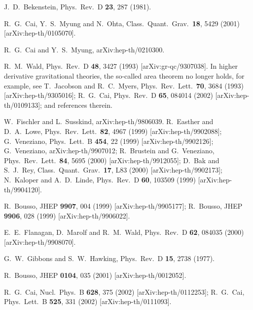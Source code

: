 \documentclass[a4paper,12pt]{article}
\begin{document}
\begin{thebibliography}{99}
J.~D.~Bekenstein,
Phys.\ Rev.\ D {\bf 23}, 287 (1981).

R.~G.~Cai, Y.~S.~Myung and N.~Ohta,
Class.\ Quant.\ Grav.\  {\bf 18}, 5429 (2001)
[arXiv:hep-th/0105070].

 R.~G.~Cai and Y.~S.~Myung,
arXiv:hep-th/0210300.

R.~M.~Wald,
Phys.\ Rev.\ D {\bf 48}, 3427 (1993)
[arXiv:gr-qc/9307038].
In higher derivative gravitational theories, the so-called area theorem 
no longer holds, for example, see
T.~Jacobson and R.~C.~Myers,
Phys.\ Rev.\ Lett.\  {\bf 70}, 3684 (1993) [arXiv:hep-th/9305016];
R.~G.~Cai,
Phys.\ Rev.\ D {\bf 65}, 084014 (2002)
[arXiv:hep-th/0109133];
and references therein. 

W.~Fischler and L.~Susskind,
arXiv:hep-th/9806039.
R.~Easther and D.~A.~Lowe,
Phys.\ Rev.\ Lett.\  {\bf 82}, 4967 (1999) [arXiv:hep-th/9902088];
G.~Veneziano,
Phys.\ Lett.\ B {\bf 454}, 22 (1999) [arXiv:hep-th/9902126];
G.~Veneziano,
arXiv:hep-th/9907012;
R.~Brustein and G.~Veneziano,
Phys.\ Rev.\ Lett.\  {\bf 84}, 5695 (2000) [arXiv:hep-th/9912055];
D.~Bak and S.~J.~Rey,
Class.\ Quant.\ Grav.\  {\bf 17}, L83 (2000)
[arXiv:hep-th/9902173];
N.~Kaloper and A.~D.~Linde,
Phys.\ Rev.\ D {\bf 60}, 103509 (1999) [arXiv:hep-th/9904120].

R.~Bousso,
JHEP {\bf 9907}, 004 (1999) [arXiv:hep-th/9905177];
R.~Bousso,
JHEP {\bf 9906}, 028 (1999) [arXiv:hep-th/9906022].

E.~E.~Flanagan, D.~Marolf and R.~M.~Wald,
Phys.\ Rev.\ D {\bf 62}, 084035 (2000) [arXiv:hep-th/9908070].

G.~W.~Gibbons and S.~W.~Hawking,
Phys.\ Rev.\ D {\bf 15}, 2738 (1977).

R.~Bousso,
JHEP {\bf 0104}, 035 (2001) [arXiv:hep-th/0012052].

R.~G.~Cai,
Nucl.\ Phys.\ B {\bf 628}, 375 (2002) [arXiv:hep-th/0112253];
R.~G.~Cai,
Phys.\ Lett.\ B {\bf 525}, 331 (2002) [arXiv:hep-th/0111093].


\end{thebibliography}
\end{document}
